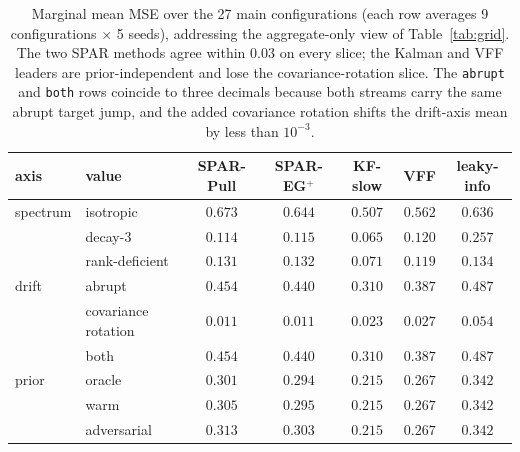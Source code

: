 \begin{table}[htbp]
\centering
\scriptsize
\setlength{\tabcolsep}{3pt}
\caption{Marginal mean MSE over the 27 main configurations (each row averages 9 configurations $\times$ 5 seeds), addressing the aggregate-only view of Table~\ref{tab:grid}. The two SPAR methods agree within $0.03$ on every slice; the Kalman and VFF leaders are prior-independent and lose the covariance-rotation slice. The \texttt{abrupt} and \texttt{both} rows coincide to three decimals because both streams carry the same abrupt target jump, and the added covariance rotation shifts the drift-axis mean by less than $10^{-3}$.}
\label{tab:marginal}
\begin{tabular}{llccccc}
\toprule
axis & value & SPAR-Pull & SPAR-EG$^+$ & KF-slow & VFF & leaky-info \\
\midrule
spectrum & isotropic & $0.673$ & $0.644$ & $0.507$ & $0.562$ & $0.636$ \\
 & decay-3 & $0.114$ & $0.115$ & $0.065$ & $0.120$ & $0.257$ \\
 & rank-deficient & $0.131$ & $0.132$ & $0.071$ & $0.119$ & $0.134$ \\
\midrule
drift & abrupt & $0.454$ & $0.440$ & $0.310$ & $0.387$ & $0.487$ \\
 & covariance rotation & $0.011$ & $0.011$ & $0.023$ & $0.027$ & $0.054$ \\
 & both & $0.454$ & $0.440$ & $0.310$ & $0.387$ & $0.487$ \\
\midrule
prior & oracle & $0.301$ & $0.294$ & $0.215$ & $0.267$ & $0.342$ \\
 & warm & $0.305$ & $0.295$ & $0.215$ & $0.267$ & $0.342$ \\
 & adversarial & $0.313$ & $0.303$ & $0.215$ & $0.267$ & $0.342$ \\
\bottomrule
\end{tabular}
\end{table}


